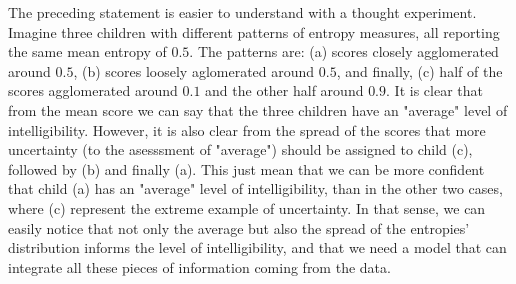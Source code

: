 The preceding statement is easier to understand with a thought experiment. Imagine three children with different patterns of entropy measures, all reporting the same mean entropy of $0.5$. The patterns are: (a) scores closely agglomerated around $0.5$, (b) scores loosely aglomerated around $0.5$, and finally, (c) half of the scores agglomerated around $0.1$ and the other half around $0.9$. It is clear that from the mean score we can say that the three children have an "average" level of intelligibility. However, it is also clear from the spread of the scores that more uncertainty (to the asesssment of "average") should be assigned to child (c), followed by (b) and finally (a). This just mean that we can be more confident that child (a) has an "average" level of intelligibility, than in the other two cases, where (c) represent the extreme example of uncertainty. In that sense, we can easily notice that not only the average but also the spread of the entropies' distribution informs the level of intelligibility, and that we need a model that can integrate all these pieces of information coming from the data.

\begin{comment}
	
	First, as previous paragraphs reveal, the intelligibility scores are `complex' in nature, however, such `complexity' is rarely fully considered in the statistical modeling procedure. The problem with the later is that, because the data does not fulfill the typical assumptions, e.g. normality, its analysis under such models might lead us to erroneous conclusions \textcolor{red}{[citation]}. On the one hand, outcomes such as the number of (un)intelligible words are discrete, while the entropy scores are continuous in nature. In addition, there is the consideration that both scores are constraint in specific bounds, i.e. the number of (un)intelligible words cannot be negative, while the entropy scores are in the bounds between zero and one. Finally, given the rating procedure's nature, the scores are produced in a clustered manner, i.e. we observe several score measurements per child. 
	
	So far the literature shows that, even when the data does not conform to the `normality' assumption, the applied statistical procedures are still supported on it, examples of this can be seen in \citep{Boonen_et_al_2021, Flipsen_et_al_2006} and \citep{Hustad_et_al_2020}. In addition, some papers in the literature have even used (hierarchical) multilevel modeling to deal with the clustered nature of the data, e.g. \citep{Boonen_et_al_2021}. However, to the authors knowledge, no paper have dealt with all of the data nuances at once, which leads us to believe that, by using more sophisticated statistical models we could improve our statistical inferences. 

\end{comment}

